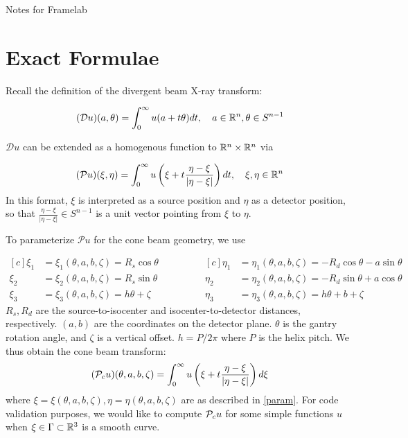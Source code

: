 \documentclass[12pt]{article}
\begin{document}
\begin{center}
Notes for Framelab
\end{center}
\section{Exact Formulae}
Recall the definition of the divergent beam X-ray transform: 

\begin{align*}
(\mathcal{D} u)(a,\theta) = \int_0^\infty u(a+t\theta)dt,\quad a\in\R^n,\theta\in S^{n-1}
\end{align*}

$\mathcal{D}u$ can be extended as a homogenous function to $\R^n\times \R^n$ via 

\begin{align*}
(\mathcal{P}u)(\xi,\eta) = \int_0^\infty u\left(\xi+t\frac{\eta-\xi}{\vert \eta-\xi\vert}\right) dt ,\quad \xi,\eta\in\R^n
\end{align*} In this format, $\xi$ is interpreted as a source position and $\eta$ as a detector position, so that $\frac{\eta-\xi}{\vert \eta-\xi\vert}\in S^{n-1}$ is a unit vector pointing from $\xi$ to $\eta$.  

To parameterize $\mathcal{P}u$ for the cone beam geometry, we use 

\begin{equation}
\begin{aligned}[c]
\xi_1 &= \xi_1(\theta,a,b,\zeta) = R_s\cos\theta \\
\xi_2 &= \xi_2(\theta,a,b,\zeta) = R_s\sin\theta \\
\xi_3 &= \xi_3(\theta,a,b,\zeta) = h\theta + \zeta
\end{aligned}\qquad \qquad
\begin{aligned}[c]
\eta_1 &= \eta_1(\theta,a,b,\zeta) = -R_d\cos\theta-a\sin\theta \\
\eta_2 &= \eta_2(\theta,a,b,\zeta) = -R_d\sin\theta+a\cos\theta \\
\eta_3 &= \eta_3(\theta,a,b,\zeta) = h\theta + b + \zeta 
\end{aligned} \label{param}
\end{equation} $R_s,R_d$ are the source-to-isocenter and isocenter-to-detector distances, respectively.  $(a,b)$ are the coordinates on the detector plane.  $\theta$ is the gantry rotation angle, and $\zeta$ is a vertical offset.  $h=P/2\pi$ where $P$ is the helix pitch.  We thus obtain the cone beam transform: 
\begin{align*}
(\P_cu)(\theta,a,b,\zeta) = \int_0^\infty u\left(\xi+t\frac{\eta-\xi}{\vert \eta-\xi\vert}\right)d\xi
\end{align*}where $\xi=\xi(\theta,a,b,\zeta),\eta=\eta(\theta,a,b,\zeta)$ are as described in \eqref{param}.  For code validation purposes, we would like to compute $\P_cu$ for some simple functions $u$ when $\xi\in \Gamma\subset\R^3$ is a smooth curve. 
\end{document}
